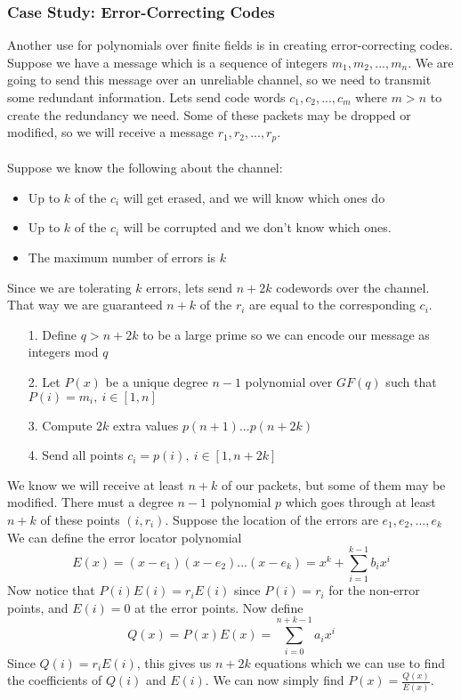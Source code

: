 \documentclass{article}
\begin{document}
\subsubsection{Case Study: Error-Correcting Codes}
Another use for polynomials over finite fields is in creating error-correcting codes.
Suppose we have a message which is a sequence of integers $m_1, m_2, ..., m_n$.
We are going to send this message over an unreliable channel, so we need to transmit some redundant information.
Lets send code words $c_1, c_2, ..., c_m$ where $m>n$ to create the redundancy we need. Some of these packets may be dropped
or modified, so we will receive a message $r_1, r_2,..., r_p$.\\\\
Suppose we know the following about the channel:
\begin{itemize}
    \item Up to $k$ of the $c_i$ will get erased, and we will know which ones do
    \item Up to $k$ of the $c_i$ will be corrupted and we don't know which ones.
    \item The maximum number of errors is $k$
\end{itemize}
Since we are tolerating $k$ errors, lets send $n+2k$ codewords over the channel. That way we
are guaranteed $n+k$ of the $r_i$ are equal to the corresponding $c_i$.
\begin{itemize}
    \item[1.] Define $q > n + 2k$ to be a large prime so we can encode our message as integers mod $q$
    \item[2.] Let $P(x)$ be a unique degree $n-1$ polynomial over $GF(q)$ such that $P(i)=m_i,\ i\in[1, n]$
    \item[3.] Compute $2k$ extra values $p(n+1)...p(n+2k)$
    \item[4.] Send all points $c_i=p(i),\ i\in[1, n+2k]$    
\end{itemize}
We know we will receive at least $n+k$ of our packets, but some of them may be modified. There must a degree $n-1$ polynomial $p$
which goes through at least $n+k$ of these points $(i, r_i)$. Suppose the location of the errors are ${e_1, e_2, ..., e_k}$
We can define the error locator polynomial $$E(x) = (x-e_1)(x-e_2)...(x-e_k) = x^k+\sum_{i=1}^{k-1}{b_ix^i}$$
Now notice that $P(i)E(i)=r_iE(i)$ since $P(i) = r_i$ for the non-error points, and $E(i)=0$ at the error points.
Now define
$$Q(x) = P(x)E(x) = \sum_{i=0}^{n+k-1}{a_ix^i}$$
Since $Q(i) = r_iE(i)$, this gives us $n+2k$ equations which we can use to find the coefficients of
$Q(i)$ and $E(i)$. We can now simply find $P(x) = \frac{Q(x)}{E(x)}$.
\end{document}
